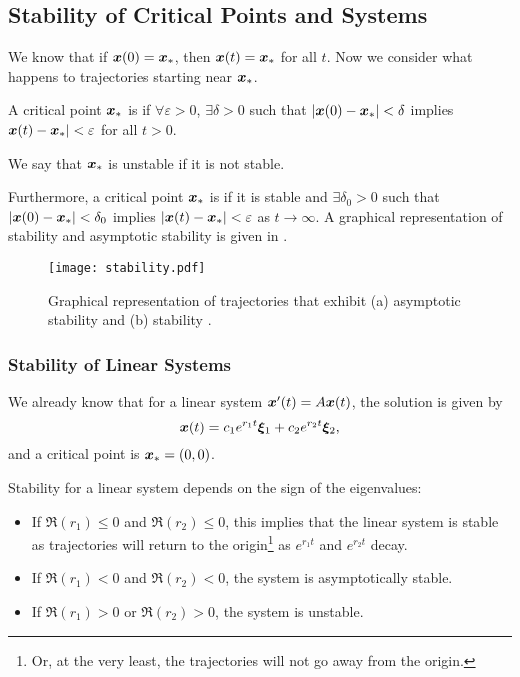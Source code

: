 \subsection{Stability of Critical Points and Systems}

We know that if $\bm{x}(0) = \bm{x}_{\ast}$, then $\bm{x}(t) = \bm{x}_{\ast}$ for all $t$. Now we consider what happens to trajectories starting near $\bm{x}_{\ast}$.

\begin{definition}
	A critical point $\bm{x}_{\ast}$ is  if $\forall \varepsilon>0$, $\exists \delta>0$ such that $|\bm{x}(0) - \bm{x}_{\ast}| < \delta$ implies $\bm{x}(t) - \bm{x}_{\ast}|<\varepsilon$ for all $t>0$.
\end{definition}

We say that $\bm{x}_{\ast}$ is unstable if it is not stable.

Furthermore, a critical point $\bm{x}_{\ast}$ is  if it is stable and $\exists \delta_0 >0$ such that $|\bm{x}(0) - \bm{x}_{\ast}| < \delta_0$ implies $|\bm{x}(t) - \bm{x}_{\ast}|<\varepsilon$ as $t \to \infty$. A graphical representation of stability and asymptotic stability is given in .

\begin{figure}[!ht]
	\centering
	\texttt{[image: stability.pdf]}
	\caption{Graphical representation of trajectories that exhibit (a) asymptotic stability and (b) stability \cite[Figure 9.2.1]{boyce}.}
	\label{fig:stability}
\end{figure}

\subsubsection{Stability of Linear Systems}

We already know that for a linear system $\bm{x}'(t) = A\bm{x}(t)$, the solution is given by
\[
\bm{x}(t) = c_1e^{r_1t}\bm{\xi}_1 + c_2e^{r_2t}\bm{\xi}_2,
\]
and a critical point is $\bm{x}_{\ast} = (0,0)$.

Stability for a linear system depends on the sign of the eigenvalues:
\begin{itemize}
	\item If $\Re(r_1) \leq 0$ and $\Re(r_2) \leq 0$, this implies that the linear system is stable as trajectories will return to the origin\footnote{Or, at the very least, the trajectories will not go away from the origin.} as $e^{r_1t}$ and $e^{r_2t}$ decay.
	\item If $\Re(r_1)<0$ and $\Re(r_2)<0$, the system is asymptotically stable.
	\item If $\Re(r_1)>0$ or $\Re(r_2)>0$, the system is unstable.
\end{itemize}

